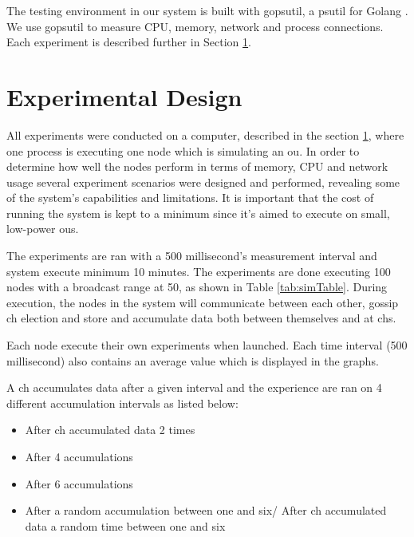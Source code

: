 \documentclass[USenglish]{uit-thesis}
\begin{document}
The testing environment in our system is built with gopsutil, a psutil for Golang \cite{golangPsutil}. We use gopsutil to measure CPU, memory, network and process connections. Each experiment is described further in Section \ref{eva:exp_des}.

\section{Experimental Design} \label{eva:exp_des}

All experiments were conducted on a computer, described in the section \ref{eva:exp_des}, where one process is executing one node which is simulating an \gls{ou}. In order to determine how well the nodes perform in terms of memory, CPU and network usage several experiment scenarios were designed and performed, revealing some of the system's capabilities and limitations. It is important that the cost of running the system is kept to a minimum since it's aimed to execute on small, low-power \gls{ou}s.

The experiments are ran with a 500 millisecond's measurement interval and system execute minimum 10 minutes. The experiments are done executing 100 nodes with a broadcast range at 50, as shown in Table \ref{tab:simTable}. During execution, the nodes in the system will communicate between each other, gossip \gls{ch} election and store and accumulate data both between themselves and at \gls{ch}s.

Each node execute their own experiments when launched. Each time interval (500 millisecond) also contains an average value which is displayed in the graphs.

A \gls{ch} accumulates data after a given interval and the experience are ran on 4 different accumulation intervals as listed below:

\begin{itemize}
\item After \gls{ch} accumulated data 2 times
\item After 4 accumulations
\item After 6 accumulations
\item After a random accumulation between one and six/ After \gls{ch} accumulated data a random time between one and six
\end{itemize}
\end{document}
